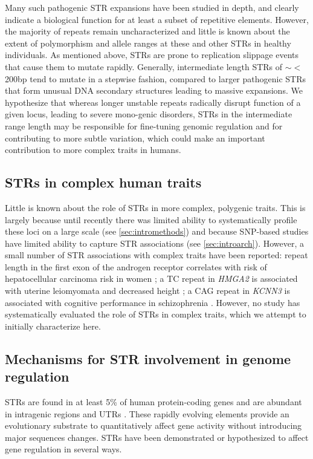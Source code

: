Many such pathogenic STR expansions have been studied in depth, and clearly indicate a biological function for at least a subset of repetitive elements. However, the majority of repeats remain uncharacterized and little is known about the extent of polymorphism and allele ranges at these and other STRs in healthy individuals. As mentioned above, STRs are prone to replication slippage events that cause them to mutate rapidly. Generally, intermediate length STRs of $\sim<$200bp tend to mutate in a stepwise fashion, compared to larger pathogenic STRs that form unusual DNA secondary structures leading to massive expansions. We hypothesize that whereas longer unstable repeats radically disrupt function of a given locus, leading to severe mono-genic disorders, STRs in the intermediate range length may be responsible for fine-tuning genomic regulation and for contributing to more subtle variation, which could make an important contribution to more complex traits in humans.

\subsection{STRs in complex human traits}
Little is known about the role of STRs in more complex, polygenic traits. This is largely because until recently there was limited ability to systematically profile these loci on a large scale (see \ref{sec:intromethods}) and because SNP-based studies have limited ability to capture STR associations (see \ref{sec:introarch}). However, a small number of STR associations with complex traits have been reported: repeat length in the first exon of the androgen receptor correlates with risk of hepatocellular carcinoma risk in women \cite{YuYangYangEtAl2002}; a TC repeat in \emph{HMGA2} is associated with uterine leiomyomata and decreased height \cite{HodgeTCuencoHuyckEtAl2009}; a CAG repeat in \emph{KCNN3} is associated with cognitive performance in schizophrenia \cite{GrubeGerchenAdamcioEtAl2011}. However, no study has systematically evaluated the role of STRs in complex traits, which we attempt to initially characterize here.

\subsection{Mechanisms for STR involvement in genome regulation}
STRs are found in at least 5\% of human protein-coding genes \cite{ODushlaineEdwardsParkEtAl2005} and are abundant in intragenic regions and UTRs \cite{LiKorolFahimaEtAl2004}. These rapidly evolving elements provide an evolutionary substrate to quantitatively affect gene activity without introducing major sequences changes. STRs have been demonstrated or hypothesized to affect gene regulation in several ways.

